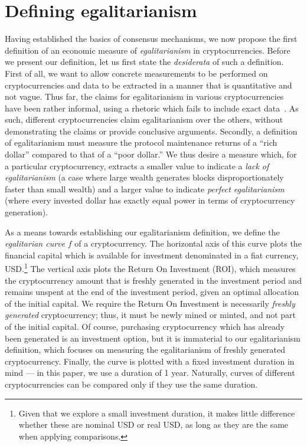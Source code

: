 
\section{Defining egalitarianism}\label{sec:definition}


Having established the basics of consensus mechanisms, we now propose the first
definition of an economic measure of \emph{egalitarianism} in cryptocurrencies.
Before we present our definition, let us first state the \emph{desiderata} of such a
definition. First of all, we want to allow concrete measurements to be
performed on cryptocurrencies and data to be extracted in a manner that is
quantitative and not vague. Thus far, the claims for egalitarianism in various
cryptocurrencies have been rather informal, using a rhetoric which fails to include
exact data~\cite{van2013cryptonote,mcmillan2013}. As such, different cryptocurrencies claim egalitarianism over the
others, without demonstrating the claims or provide conclusive arguments.
Secondly, a definition of egalitarianism must measure the protocol maintenance 
returns of a ``rich dollar'' compared to that of a ``poor dollar.''
We thus desire a
measure which, for a particular cryptocurrency, extracts a smaller value
to indicate a \emph{lack of egalitarianism} (\eg a
case where large wealth generates blocks disproportionately faster than
small wealth) and a larger value to indicate \emph{perfect egalitarianism} (where
every invested dollar has exactly equal power in terms of cryptocurrency
generation).

As a means towards establishing our egalitarianism definition, we define the
\emph{egalitarian curve} $f$ of a cryptocurrency. The horizontal axis of this
curve plots the financial capital which is available for investment denominated
in a fiat currency, USD.\footnote{Given that we explore
a small investment duration, it makes little difference whether these are
nominal USD or real USD, as long as they are the same when applying comparisons.}  The
vertical axis plots the Return On Investment (ROI), which measures the
cryptocurrency amount that is freshly generated in the investment period and
remains unspent at the end of the investment period,
given an optimal allocation of the initial capital. We require
the Return On Investment is necessarily \emph{freshly generated}
cryptocurrency; thus, it must be newly mined or minted, and not part of the
initial capital. Of course, purchasing
cryptocurrency which has already been generated is an investment option, but it
is immaterial to our egalitarianism definition, which focuses on measuring the
egalitarianism of freshly generated cryptocurrency.  Finally, the curve is
plotted with a fixed investment duration in mind --- in this paper, we use a
duration of 1 year.  Naturally, curves of different cryptocurrencies can be
compared only if they use the same duration.

